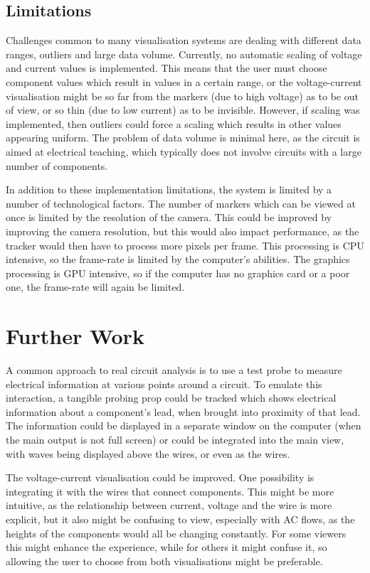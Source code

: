 \subsection{Limitations}

Challenges common to many visualisation systems are dealing with different data ranges, outliers and large data volume. Currently, no automatic scaling of voltage and current values is implemented. This means that the user must choose component values which result in values in a certain range, or the voltage-current visualisation might be so far from the markers (due to high voltage) as to be out of view, or so thin (due to low current) as to be invisible. However, if scaling was implemented, then outliers could force a scaling which results in other values appearing uniform. The problem of data volume is minimal here, as the circuit is aimed at electrical teaching, which typically does not involve circuits with a large number of components.

In addition to these implementation limitations, the system is limited by a number of technological factors. The number of markers which can be viewed at once is limited by the resolution of the camera. This could be improved by improving the camera resolution, but this would also impact performance, as the tracker would then have to process more pixels per frame. This processing is CPU intensive, so the frame-rate is limited by the computer's abilities. The graphics processing is GPU intensive, so if the computer has no graphics card or a poor one, the frame-rate will again be limited.

\section{Further Work}

A common approach to real circuit analysis is to use a test probe to measure electrical information at various points around a circuit. To emulate this interaction, a tangible probing prop could be tracked which shows electrical information about a component's lead, when brought into proximity of that lead. The information could be displayed in a separate window on the computer (when the main output is not full screen) or could be integrated into the main view, with waves being displayed above the wires, or even as the wires.

The voltage-current visualisation could be improved. One possibility is integrating it with the wires that connect components. This might be more intuitive, as the relationship between current, voltage and the wire is more explicit, but it also might be confusing to view, especially with AC flows, as the heights of the components would all be changing constantly. For some viewers this might enhance the experience, while for others it might confuse it, so allowing the user to choose from both visualisations might be preferable.

